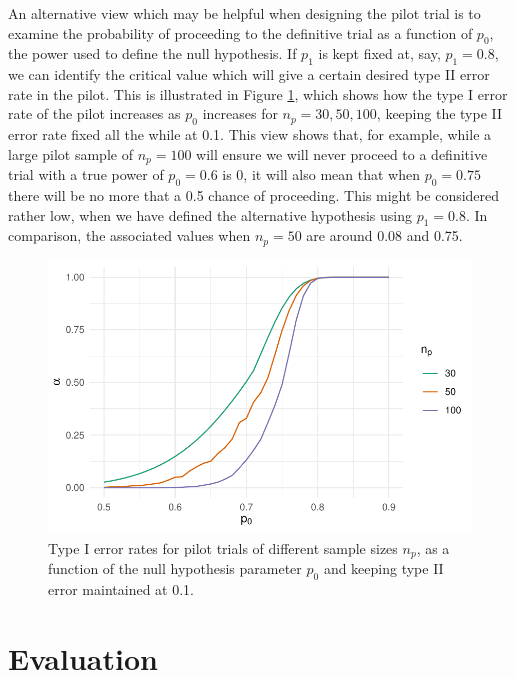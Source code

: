 \documentclass[AMA,STIX1COL]{WileyNJD-v2}
\begin{document}
An alternative view which may be helpful when designing the pilot trial is to examine the probability of proceeding to the definitive trial as a function of $p_0$, the power used to define the null hypothesis. If $p_1$ is kept fixed at, say, $p_1 = 0.8$, we can identify the critical value which will give a certain desired type II error rate in the pilot. This is illustrated in Figure \ref{fig:eval2}, which shows how the type I error rate of the pilot increases as $p_0$ increases for $n_p = 30, 50, 100$, keeping the type II error rate fixed all the while at 0.1. This view shows that, for example, while a large pilot sample of $n_p = 100$ will ensure we will never proceed to a definitive trial with a true power of $p_0 = 0.6$ is 0, it will also mean that when $p_0 = 0.75$ there will be no more that a 0.5 chance of proceeding. This might be considered rather low, when we have defined the alternative hypothesis using $p_1 = 0.8$. In comparison, the associated values when $n_p = 50$ are around 0.08 and 0.75.

\begin{figure}
\centering
\includegraphics[scale=0.8]{./Figures/eval2.pdf}
\caption{Type I error rates for pilot trials of different sample sizes $n_p$, as a function of the null hypothesis parameter $p_0$ and keeping type II error maintained at 0.1.}
\label{fig:eval2}
\end{figure}

\section{Evaluation}\label{sec:eval}

\end{document}
